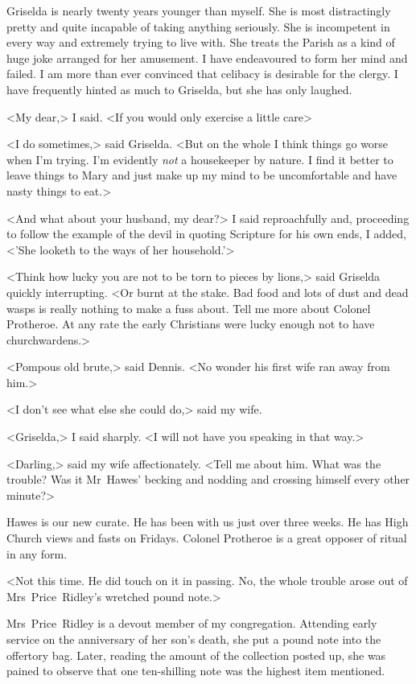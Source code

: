Griselda is nearly twenty years younger than myself. She is most distractingly pretty and quite incapable of taking anything seriously. She is incompetent in every way and extremely trying to live with. She treats the Parish as a kind of huge joke arranged for her amusement. I have endeavoured to form her mind and failed. I am more than ever convinced that celibacy is desirable for the clergy. I have frequently hinted as much to Griselda, but she has only laughed.

<My dear,> I said. <If you would only exercise a little care\longdash>

<I do sometimes,> said Griselda. <But on the whole I think things go worse when I'm trying. I'm evidently \emph{not} a housekeeper by nature. I find it better to leave things to Mary and just make up my mind to be uncomfortable and have nasty things to eat.>

<And what about your husband, my dear?> I said reproachfully and, proceeding to follow the example of the devil in quoting Scripture for his own ends, I added, <'She looketh to the ways of her household.'>

<Think how lucky you are not to be torn to pieces by lions,> said Griselda quickly interrupting. <Or burnt at the stake. Bad food and lots of dust and dead wasps is really nothing to make a fuss about. Tell me more about Colonel Protheroe. At any rate the early Christians were lucky enough not to have churchwardens.>

<Pompous old brute,> said Dennis. <No wonder his first wife ran away from him.>

<I don't see what else she could do,> said my wife.

<Griselda,> I said sharply. <I will not have you speaking in that way.>

<Darling,> said my wife affectionately. <Tell me about him. What was the trouble? Was it Mr~Hawes' becking and nodding and crossing himself every other minute?>

Hawes is our new curate. He has been with us just over three weeks. He has High Church views and fasts on Fridays. Colonel Protheroe is a great opposer of ritual in any form.

<Not this time. He did touch on it in passing. No, the whole trouble arose out of Mrs~Price~Ridley's wretched pound note.>

Mrs~Price~Ridley is a devout member of my congregation. Attending early service on the anniversary of her son's death, she put a pound note into the offertory bag. Later, reading the amount of the collection posted up, she was pained to observe that one ten-shilling note was the highest item mentioned.

